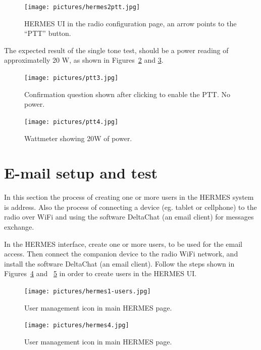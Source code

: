 \documentclass[11pt,a4paper]{article}
\begin{document}
\begin{figure}[H]
  \centering
  \texttt{[image: pictures/hermes2ptt.jpg]}
  \caption{HERMES UI in the radio configuration page, an arrow points to the ``PTT'' button.}
  \label{fig:hermes2}
\end{figure}

The expected result of the single tone test, should be a power reading of approximatelly 20 W, as shown
in Figures~\ref{fig:ptt3} and \ref{fig:ptt4}.

\begin{figure}[H]
  \centering
  \texttt{[image: pictures/ptt3.jpg]}
  \caption{Confirmation question shown after clicking to enable the PTT. No power.}
  \label{fig:ptt3}
\end{figure}

\begin{figure}[H]
  \centering
  \texttt{[image: pictures/ptt4.jpg]}
  \caption{Wattmeter showing 20W of power.}
  \label{fig:ptt4}
\end{figure}





\section{E-mail setup and test}

In this section the process of creating one or more users in the HERMES system is address. Also the process
of connecting a device (eg. tablet or cellphone) to the radio over WiFi and using the software DeltaChat (an email client)
for messages exchange.

In the HERMES interface, create one or more users, to be used for the email access. Then connect the companion
device to the radio WiFi network, and install the software DeltaChat (an email client). Follow the steps
shown in Figures~\ref{fig:hermes1users} and ~\ref{fig:hermes4}  in order to create users in the HERMES UI.

\begin{figure}[H]
  \centering
  \texttt{[image: pictures/hermes1-users.jpg]}
  \caption{User management icon in main HERMES page.}
  \label{fig:hermes1users}
\end{figure}

\begin{figure}[H]
  \centering
  \texttt{[image: pictures/hermes4.jpg]}
  \caption{User management icon in main HERMES page.}
  \label{fig:hermes4}
\end{figure}
\end{document}
